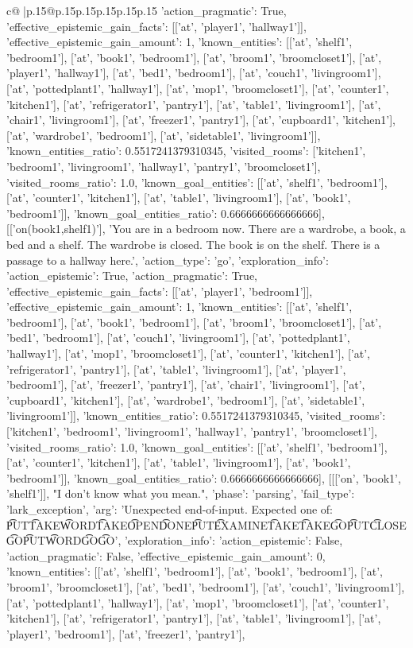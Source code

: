 \documentclass{article}
\begin{document}
{\begin{supertabular}{c@{$\;$}|p{.15\linewidth}@{}p{.15\linewidth}p{.15\linewidth}p{.15\linewidth}p{.15\linewidth}p{.15\linewidth}}
{{{'action_pragmatic': True, 'effective_epistemic_gain_facts': [['at', 'player1', 'hallway1']], 'effective_epistemic_gain_amount': 1, 'known_entities': [['at', 'shelf1', 'bedroom1'], ['at', 'book1', 'bedroom1'], ['at', 'broom1', 'broomcloset1'], ['at', 'player1', 'hallway1'], ['at', 'bed1', 'bedroom1'], ['at', 'couch1', 'livingroom1'], ['at', 'pottedplant1', 'hallway1'], ['at', 'mop1', 'broomcloset1'], ['at', 'counter1', 'kitchen1'], ['at', 'refrigerator1', 'pantry1'], ['at', 'table1', 'livingroom1'], ['at', 'chair1', 'livingroom1'], ['at', 'freezer1', 'pantry1'], ['at', 'cupboard1', 'kitchen1'], ['at', 'wardrobe1', 'bedroom1'], ['at', 'sidetable1', 'livingroom1']], 'known_entities_ratio': 0.5517241379310345, 'visited_rooms': ['kitchen1', 'bedroom1', 'livingroom1', 'hallway1', 'pantry1', 'broomcloset1'], 'visited_rooms_ratio': 1.0, 'known_goal_entities': [['at', 'shelf1', 'bedroom1'], ['at', 'counter1', 'kitchen1'], ['at', 'table1', 'livingroom1'], ['at', 'book1', 'bedroom1']], 'known_goal_entities_ratio': 0.6666666666666666}}], [['on(book1,shelf1)'], 'You are in a bedroom now. There are a wardrobe, a book, a bed and a shelf. The wardrobe is closed. The book is on the shelf. There is a passage to a hallway here.', {'action_type': 'go', 'exploration_info': {'action_epistemic': True, 'action_pragmatic': True, 'effective_epistemic_gain_facts': [['at', 'player1', 'bedroom1']], 'effective_epistemic_gain_amount': 1, 'known_entities': [['at', 'shelf1', 'bedroom1'], ['at', 'book1', 'bedroom1'], ['at', 'broom1', 'broomcloset1'], ['at', 'bed1', 'bedroom1'], ['at', 'couch1', 'livingroom1'], ['at', 'pottedplant1', 'hallway1'], ['at', 'mop1', 'broomcloset1'], ['at', 'counter1', 'kitchen1'], ['at', 'refrigerator1', 'pantry1'], ['at', 'table1', 'livingroom1'], ['at', 'player1', 'bedroom1'], ['at', 'freezer1', 'pantry1'], ['at', 'chair1', 'livingroom1'], ['at', 'cupboard1', 'kitchen1'], ['at', 'wardrobe1', 'bedroom1'], ['at', 'sidetable1', 'livingroom1']], 'known_entities_ratio': 0.5517241379310345, 'visited_rooms': ['kitchen1', 'bedroom1', 'livingroom1', 'hallway1', 'pantry1', 'broomcloset1'], 'visited_rooms_ratio': 1.0, 'known_goal_entities': [['at', 'shelf1', 'bedroom1'], ['at', 'counter1', 'kitchen1'], ['at', 'table1', 'livingroom1'], ['at', 'book1', 'bedroom1']], 'known_goal_entities_ratio': 0.6666666666666666}}], [[['on', 'book1', 'shelf1']], "I don't know what you mean.", {'phase': 'parsing', 'fail_type': 'lark_exception', 'arg': 'Unexpected end-of-input. Expected one of: \n\t* PUT\n\t* TAKE\n\t* WORD\n\t* TAKE\n\t* OPEN\n\t* DONE\n\t* PUT\n\t* EXAMINE\n\t* TAKE\n\t* TAKE\n\t* GO\n\t* PUT\n\t* CLOSE\n\t* GO\n\t* PUT\n\t* WORD\n\t* GO\n\t* GO\n', 'exploration_info': {'action_epistemic': False, 'action_pragmatic': False, 'effective_epistemic_gain_amount': 0, 'known_entities': [['at', 'shelf1', 'bedroom1'], ['at', 'book1', 'bedroom1'], ['at', 'broom1', 'broomcloset1'], ['at', 'bed1', 'bedroom1'], ['at', 'couch1', 'livingroom1'], ['at', 'pottedplant1', 'hallway1'], ['at', 'mop1', 'broomcloset1'], ['at', 'counter1', 'kitchen1'], ['at', 'refrigerator1', 'pantry1'], ['at', 'table1', 'livingroom1'], ['at', 'player1', 'bedroom1'], ['at', 'freezer1', 'pantry1'], }}}
\end{supertabular}}
\end{document}

